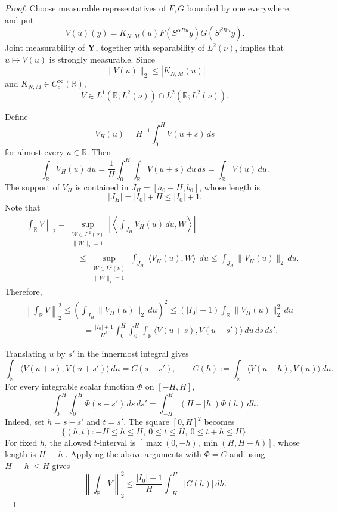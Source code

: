 \documentclass[10pt,a4paper]{amsart}
\def \R {\mathbb R}
\numberwithin{equation}{section}
\begin{document}
\setcounter{section}{3}
\setcounter{equation}{5}
\setcounter{cl}{0}
\setcounter{fact}{0}
\setcounter{step}{0}
\setcounter{thm}{2}
\begin{proof}
Choose measurable representatives of $F,G$ bounded by one everywhere,
and put
\[
 V(u)(y)=K_{N,M}(u)F(S^{\alpha Ru}y)G(S^{\beta Ru}y).
\]
Joint measurability of ${\bf Y}$, together with separability of $L^2(\nu)$, implies that $u\mapsto V(u)$ is strongly measurable. Since $$\|V(u)\|_2\le|K_{N,M}(u)|$$ and $K_{N,M}\in C_c^\infty(\R)$,\[
 V\in L^1(\R;L^2(\nu))\cap L^2(\R;L^2(\nu)).
\]

Define
$$V_H(u)=H^{-1}\int_0^H V(u+s)\,ds$$ for almost every $u\in\R$. Then
$$\int_\R V_H(u)\,du=\frac1H\int_0^H\int_\R V(u+s)\,du\,ds=\int_\R V(u)\,du.$$
The support of $V_H$ is contained in $J_H=[a_0-H,b_0]$, whose length is
$$|J_H|=|I_0|+H\le |I_0|+1.$$ 
Note that 
\begin{align*}
& \left\|\int_\R V\right\|_2=\sup_{\substack{W\in L^2(\nu)\\ \|W\|_2=1}} \left|\left\langle\int_{J_H}V_H(u)\,du,W\right\rangle\right|
\\ & \hspace{3cm}\le\sup_{\substack{W\in L^2(\nu)\\ \|W\|_2=1}}
\int_{J_H}|\langle V_H(u),W\rangle|\,du
\le\int_{J_H}\|V_H(u)\|_2\,du.
\end{align*}
Therefore,
\begin{align*}
 &\left\|\int_\R V\right\|_2^2
 \le \left(\int_{J_H}\|V_H(u)\|_2\,du\right)^2
 \le (|I_0|+1)\int_\R\|V_H(u)\|_2^2\,du\\
 &\hspace{3cm}=\frac{|I_0|+1}{H^2}\int_0^H\int_0^H\int_\R
       \langle V(u+s),V(u+s')\rangle\,du\,ds\,ds'.
\end{align*}

Translating $u$ by $s'$ in the innermost integral gives
\[
 \int_\R\langle V(u+s),V(u+s')\rangle\,du=C(s-s'),
 \qquad
 C(h):=\int_\R\langle V(u+h),V(u)\rangle\,du.
\]
For every integrable scalar function $\Phi$ on $[-H,H]$,
\[
 \int_0^H\int_0^H\Phi(s-s')\,ds\,ds'
 =\int_{-H}^H(H-|h|)\Phi(h)\,dh.
\]
Indeed, set $h=s-s'$ and $t=s'$. The square $[0,H]^2$ becomes
\[
 \{(h,t):-H\le h\le H,\ 0\le t\le H,\ 0\le t+h\le H\}.
\]
For fixed $h$, the allowed $t$-interval is
$[\max(0,-h),\min(H,H-h)]$, whose length is $H-|h|$. Applying the above arguments with $\Phi=C$ and using $H-|h|\le H$ gives
\[
 \left\|\int_\R V\right\|_2^2
 \le\frac{|I_0|+1}{H}\int_{-H}^H|C(h)|\,dh.
\]


\end{proof}
\end{document}
